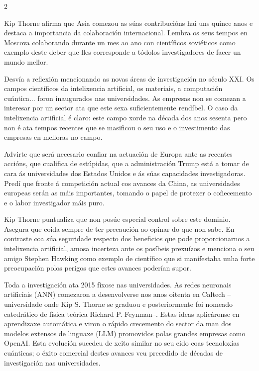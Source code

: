 \begin{multicols}{2}

Kip Thorne afirma que Asia comezou as súas contribucións hai uns quince anos e
destaca a importancia da colaboración internacional. Lembra os seus tempos en
Moscova colaborando durante un mes ao ano con científicos soviéticos como
exemplo deste deber que lles corresponde a tódolos investigadores de facer un
mundo mellor.

Desvía a reflexión mencionando as novas áreas de investigación no século XXI.
Os campos científicos da intelixencia artificial, os materiais, a computación
cuántica... foron inaugurados nas universidades. As empresas non se comezan a
interesar por un sector ata que este sexa suficientemente rendíbel. O caso da
intelixencia artificial é claro: este campo xorde na década dos anos sesenta
pero non é ata tempos recentes que se masificou o seu uso e o investimento das
empresas en melloras no campo.

Advirte que será necesario confiar na actuación de Europa ante as recentes
accións, que cualifica de estúpidas, que a administración Trump está a tomar de
cara ás universidades dos Estados Unidos e ás súas capacidades investigadoras.
Predí que fronte á competición actual cos avances da China, as universidades
europeas serán as máis importantes, tomando o papel de protexer o coñecemento e
o labor investigador máis puro.


Kip Thorne puntualiza que non posúe especial control sobre este dominio.
Asegura que coida sempre de ter precaución ao opinar do que non sabe. En
contraste coa súa seguridade respecto dos beneficios que pode proporcionarnos a
intelixencia artificial, amosa incerteza ante os posíbeis prexuízos e menciona
o seu amigo Stephen Hawking como exemplo de científico que si manifestaba unha
forte preocupación polos perigos que estes avances poderían supor.

Toda a investigación ata 2015 fíxose nas universidades. As redes neuronais
artificiais (ANN) comezaron a desenvolverse nos anos oitenta en Caltech
--universidade onde Kip S. Thorne se graduou e posteriormente foi nomeado
catedrático de física teórica Richard P. Feynman--. Estas ideas aplicáronse en
aprendizaxe automática e viron o rápido crecemento do sector da man dos modelos
extensos de linguaxe (LLM) promovidos polas grandes empresas como OpenAI. Esta
evolución sucedeu de xeito similar no seu eido coas tecnoloxías cuánticas; o
éxito comercial destes avances veu precedido de décadas de investigación nas
universidades.


\end{multicols}

